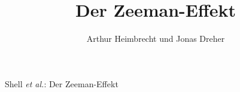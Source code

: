 %
\ifCLASSINFOpdf
\else
\fi
%
%



%
\title{Der Zeeman-Effekt}
%
%
%

\author{Arthur Heimbrecht und Jonas Dreher}


%
{Shell \MakeLowercase{\textit{et al.}}: Der Zeeman-Effekt}
%

